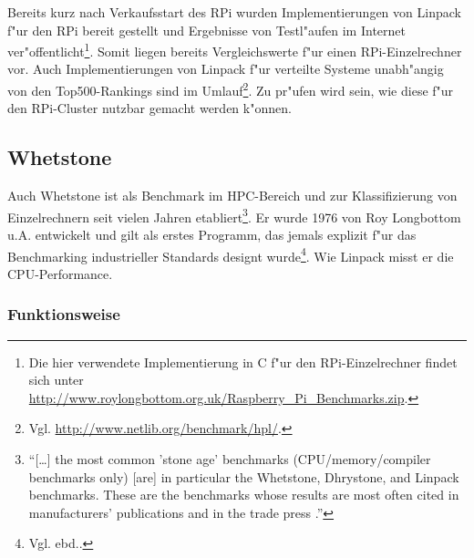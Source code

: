 Bereits kurz nach Verkaufsstart des RPi wurden Implementierungen von Linpack f"ur den RPi bereit gestellt und Ergebnisse von Testl"aufen im Internet ver"offentlicht\footnote{Die hier verwendete Implementierung in C f"ur den RPi-Einzelrechner findet sich unter \url{http://www.roylongbottom.org.uk/Raspberry_Pi_Benchmarks.zip}.}. Somit liegen bereits Vergleichswerte f"ur einen RPi-Einzelrechner vor. Auch Implementierungen von Linpack f"ur verteilte Systeme unabh"angig von den Top500-Rankings sind im Umlauf\footnote{Vgl. \url{http://www.netlib.org/benchmark/hpl/}.}. Zu pr"ufen wird sein, wie diese f"ur den RPi-Cluster nutzbar gemacht werden k"onnen. 

\subsection{Whetstone}\label{Whetstone}

Auch Whetstone ist als Benchmark im HPC-Bereich und zur Klassifizierung von Einzelrechnern seit vielen Jahren etabliert\footnote{"`[\dots] the most common 'stone age' benchmarks (CPU/memory/compiler benchmarks only) [are] in particular the Whetstone, Dhrystone, and Linpack benchmarks. These are the benchmarks whose results are most often cited in manufacturers' publications and in the trade press \cite{wei90}."'}. Er wurde 1976 von Roy Longbottom u.A. entwickelt und gilt als erstes Programm, das jemals explizit f"ur das Benchmarking industrieller Standards designt wurde\footnote{Vgl. ebd..}. Wie Linpack misst er die CPU-Performance. 

\subsubsection{Funktionsweise}\label{Funktionsweise Whetstone}

